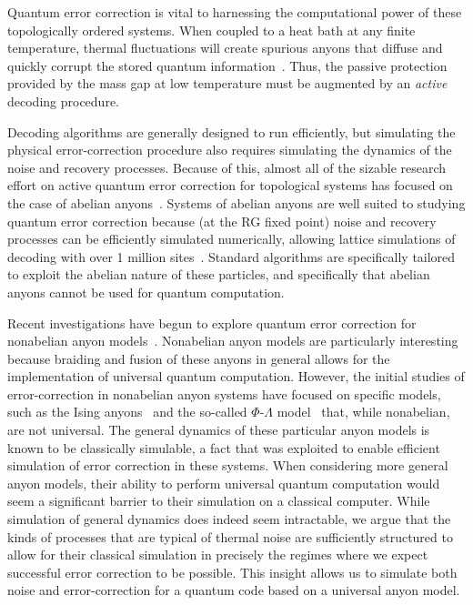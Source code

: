 \documentclass[aps, prl, letterpaper, twocolumn, superscriptaddress, notitlepage, 10pt]{revtex4-1}
\begin{document}
Quantum error correction is vital to harnessing the computational power of these topologically 
ordered systems. When coupled to a heat bath at any finite temperature, thermal fluctuations 
will create spurious anyons that diffuse and quickly corrupt the stored quantum 
information~\cite{Pastawski2010}. Thus, the passive protection provided by the mass gap 
at low temperature must be augmented by an \emph{active} decoding procedure. 

Decoding algorithms are generally designed to run efficiently, but simulating the physical error-correction procedure also requires simulating the dynamics of the noise and recovery processes. 
Because of this, almost all of the sizable research effort on active quantum error correction for topological systems has focused on the case of abelian anyons~\cite{Dennis2002, Duclos-Cianci2010, Duclos-Cianci2010a, Wang2010, Wang2010a, Duclos-Cianci2013, Bravyi2011, Bombin2012, Wootton2012, Anwar2014, Watson2014, Hutter2014a, Bravyi2014, Wootton2015, Fowler2015, Andrist2015}.
Systems of abelian anyons are well suited to studying quantum error correction because (at the RG fixed point) noise and recovery processes can be efficiently simulated numerically, allowing lattice simulations of decoding with over 1 million sites~\cite{Duclos-Cianci2010}. 
Standard algorithms are specifically tailored to exploit the abelian nature of these particles, and specifically that abelian anyons cannot be used for quantum computation. 

Recent investigations have begun to explore quantum error correction for nonabelian anyon 
models~\cite{Brell2013, Wootton2013, Hutter2014}. Nonabelian anyon models are particularly interesting 
because braiding and fusion of these anyons in general allows for the implementation of universal quantum 
computation. However, the initial studies of error-correction in nonabelian anyon systems have focused on specific models, such as the Ising 
anyons~\cite{Brell2013} and the so-called $\Phi$-$\Lambda$ 
model~\cite{Wootton2013, Hutter2014} that, while nonabelian, are not universal. The general dynamics of these particular anyon models is known to be classically simulable, a fact
that was exploited to enable efficient simulation of error correction in these systems. When considering more general anyon models, their ability to perform universal quantum computation would seem a significant barrier to their simulation on a classical computer. While simulation of general dynamics does indeed seem intractable, we argue that the kinds of processes that are typical of thermal noise are sufficiently structured to allow for their classical simulation in precisely the regimes where we expect successful error correction to be possible. This insight allows us to simulate both noise and error-correction for a quantum code based on a universal anyon model.
\end{document}
